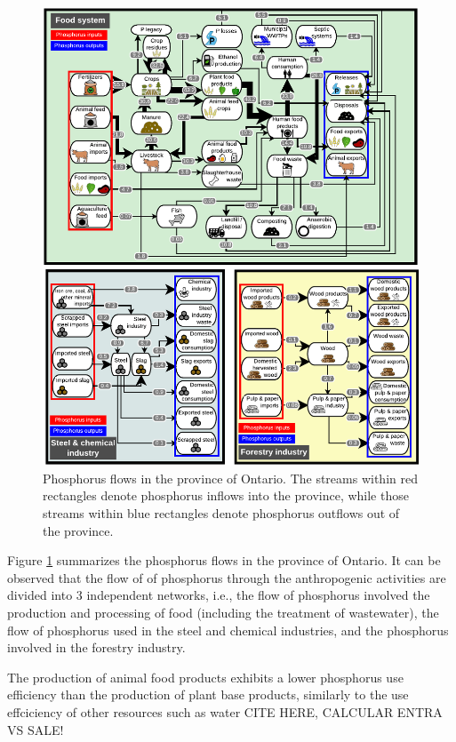 \documentclass[authoryear]{elsarticle}
\begin{document}
\begin{figure}[H]
	\centering
	\includegraphics[width=1\linewidth, trim={0cm 0cm 0cm 0cm},clip]{Figures/Diagram2-3.pdf} 
	\caption{Phosphorus flows in the province of Ontario. The streams within red rectangles denote phosphorus inflows into the province, while those streams within blue rectangles denote phosphorus outflows out of the province.}
	\label{fig:FigFlowsSummary}
\end{figure}

Figure \ref{fig:FigFlowsSummary} summarizes the phosphorus flows in the province of Ontario. It can be observed that the flow of of phosphorus through the anthropogenic activities are divided into 3 independent networks, i.e., the flow of phosphorus involved the production and processing of food (including the treatment of wastewater), the flow of phosphorus used in the steel and chemical industries, and the phosphorus involved in the forestry industry.

The production of animal food products exhibits a lower phosphorus use efficiency than the production of plant base products, similarly to the use effciciency of other resources such as water CITE HERE, CALCULAR ENTRA VS SALE!
\end{document}
